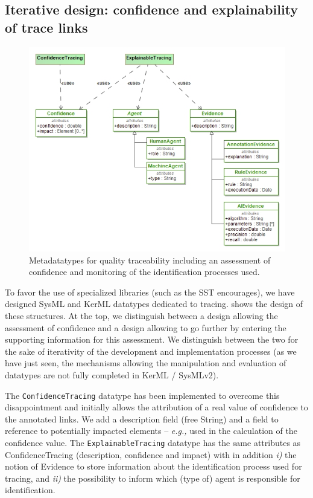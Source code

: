 \subsection{Iterative design: confidence and explainability of trace links}\label{sec:design}
\begin{figure}[ht]      
	\centering
	\includegraphics[width=.9\linewidth]{images/explainability-datatype.jpg}
	\caption{Metadatatypes for quality traceability including an assessment of confidence and monitoring of the identification processes used.}
	\label{fig:datatypes}
\end{figure}

To favor the use of specialized libraries (such as the SST encourages), we have designed SysML and KerML datatypes dedicated to tracing. 
 shows the design of these structures. At the top, we distinguish between a design allowing the assessment of confidence and a design allowing to go further by entering the supporting information for this assessment.
We distinguish between the two for the sake of iterativity of the development and implementation processes (as we have just seen, the mechanisms allowing the manipulation and evaluation of datatypes are not fully completed in KerML / SysMLv2).

The \texttt{ConfidenceTracing} datatype has been implemented to overcome this disappointment and initially allows the attribution of a real value of confidence to the annotated links. We add a description field (free String) and a field to reference to potentially impacted elements -- \textit{e.g.,} used in the calculation of the confidence value.
The \texttt{ExplainableTracing} datatype has the same attributes as ConfidenceTracing (description, confidence and impact) with in addition \textit{i)} the notion of Evidence to store information about the identification process used for tracing, and \textit{ii)} the possibility to inform which (type of) agent is responsible for identification.

